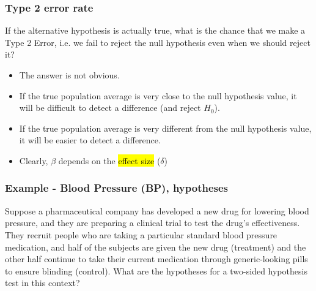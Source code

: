 \begin{frame}
\frametitle{Type 2 error rate}

If the alternative hypothesis is actually true, what is the chance that we make a Type 2 Error, i.e. we fail to reject the null hypothesis even when we should reject it?

\begin{itemize}

\item The answer is not obvious.

\item If the true population average is very close to the null hypothesis value, it will be difficult to detect a difference (and reject $H_0$).

\item If the true population average is very different from the null hypothesis value, it will be easier to detect a difference.

\item Clearly, $\beta$ depends on the \hl{effect size} ($\delta$)
\end{itemize}

\end{frame}


\begin{frame}
\frametitle{Example - Blood Pressure (BP), hypotheses}

{\dq
{\footnotesize
Suppose a pharmaceutical company has developed a new drug for lowering blood pressure, and they are preparing a clinical trial to test the drug's effectiveness. They recruit people who are taking a particular standard blood pressure medication, and half of the subjects are given the new drug (treatment) and the other half continue to take their current medication through generic-looking pills to ensure blinding (control). What are the hypotheses for a two-sided hypothesis test in this context?
}
}

\pause


\end{frame}


